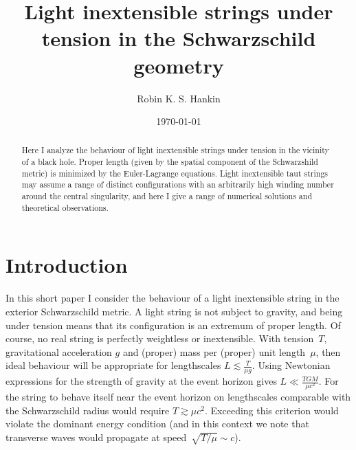 \documentclass[prb,preprint]{revtex4-1}
\begin{document}

\title{Light inextensible strings under tension in the Schwarzschild geometry}

\author{Robin K. S. Hankin}


\date{\today}

\begin{abstract}
Here I analyze the behaviour of light inextensible strings under
tension in the vicinity of a black hole.  Proper length (given by the
spatial component of the Schwarzshild metric) is minimized by the
Euler-Lagrange equations.  Light inextensible taut strings may assume
a range of distinct configurations with an arbitrarily high winding
number around the central singularity, and here I give a range of
numerical solutions and theoretical observations.
\end{abstract}


\maketitle %

\section{Introduction}

In this short paper I consider the behaviour of a light inextensible
string in the exterior Schwarzschild metric.  A light string is not
subject to gravity, and being under tension means that its
configuration is an extremum of proper length.  Of course, no real
string is perfectly weightless or inextensible.  With tension~$T$,
gravitational acceleration $g$ and (proper) mass per (proper) unit
length~$\mu$, then ideal behaviour will be appropriate for
lengthscales $L\lesssim\frac{T}{\mu g}$.  Using Newtonian expressions
for the strength of gravity at the event horizon gives
$L\ll\frac{TGM}{\mu c^2}$.  For the string to behave itself near the
event horizon on lengthscales comparable with the Schwarzschild radius
would require $T\gtrsim\mu c^2$.  Exceeding this criterion would
violate the dominant energy condition (and in this context we note
that transverse waves would propagate at speed~$\sqrt{T/\mu}\sim c$).
\end{document}
